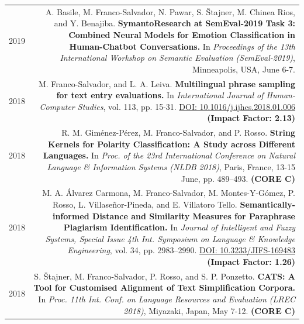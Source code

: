 \documentclass[10pt]{article}
\begin{document}
\begin{tabular}{L!{\VRule}R}
	2019 & A. Basile, M. Franco-Salvador, N. Pawar, S. \v{S}tajner, M. Chinea Rios, and Y. Benajiba. \textbf{SymantoResearch at SemEval-2019 Task 3: Combined Neural Models for Emotion Classification in Human-Chatbot Conversations.}
	In \emph{Proceedings of the 13th International Workshop on Semantic Evaluation (SemEval-2019)}, Minneapolis, USA, June 6-7.\vspace{5pt}\\	
	2018 & M. Franco-Salvador, and L. A. Leiva. \textbf{Multilingual phrase sampling for text entry evaluations.}
	In \emph{International Journal of Human-Computer Studies}, vol. 113, pp. 15-31. \href{https://doi.org/10.1016/j.ijhcs.2018.01.006}{DOI: 10.1016/j.ijhcs.2018.01.006} \textbf{(Impact Factor: 2.13)} \vspace{5pt}\\	
	2018& R. M. Gim{\'e}nez-P{\'e}rez, M. Franco-Salvador, and P. Rosso. \textbf{String Kernels for Polarity Classification: A Study across Different Languages.}
	In \emph{Proc. of the 23rd International Conference on Natural Language \& Information Systems (NLDB 2018)}, Paris, France, 13-15 June, pp. 489--493. \textbf{(CORE C)}\vspace{5pt}\\
	2018&M. A. {\'A}lvarez Carmona,  M. Franco-Salvador, M. Montes-Y-G{\'o}mez, P. Rosso, L. Villase{\~n}or-Pineda, and E. Villatoro Tello. \textbf{Semantically-informed Distance and Similarity Measures for Paraphrase Plagiarism Identification.}
	In \emph{Journal of Intelligent and Fuzzy Systems, Special Issue 4th Int. Symposium on Language \& Knowledge Engineering}, vol. 34, pp. 2983--2990. \href{https://doi.org/10.3233/JIFS-169483}{DOI: 10.3233/JIFS-169483} \textbf{(Impact Factor: 1.26)} \vspace{5pt}\\
	2018 & S. \v{S}tajner, M. Franco-Salvador, P. Rosso, and S. P. Ponzetto. \textbf{CATS: A Tool for Customised Alignment of Text Simplification Corpora.} In \emph{Proc. 11th Int. Conf. on Language Resources and Evaluation (LREC 2018)}, Miyazaki, Japan, May 7-12. \textbf{(CORE C)} \vspace{5pt}\\	
\end{tabular}
\end{document}
